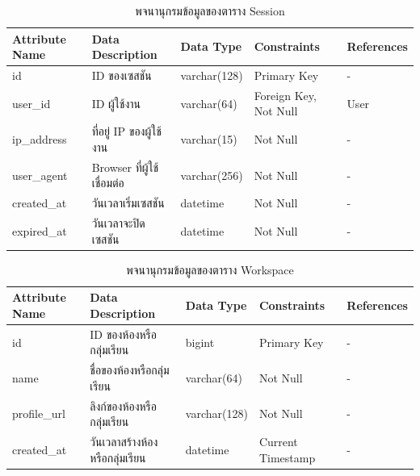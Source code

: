 \documentclass[12pt,one side,openright,a4paper]{cpe-thesis-th}
\begin{document}
    \begin{table}[H]
        \centering
        \caption{พจนานุกรมข้อมูลของตาราง Session}\label{tbl:data-dict-session}
        \begin{tabular}{p{2cm}|p{4cm}p{2cm}p{3cm}p{2cm}} \hline\hline
            Attribute Name & Data Description & Data Type & Constraints & References \\ \hline\hline
            id & ID ของเซสชัน & varchar(128) & Primary Key & - \\
            user\_id & ID ผู้ใช้งาน & varchar(64) & Foreign Key, Not Null & User \\
            ip\_address & ที่อยู่ IP ของผู้ใช้งาน & varchar(15) & Not Null & - \\
            user\_agent & Browser ที่ผู้ใช้เชื่อมต่อ & varchar(256) & Not Null & - \\
            created\_at & วันเวลาเริ่มเซสชัน & datetime & Not Null & - \\
            expired\_at & วันเวลาจะปิดเซสชัน & datetime & Not Null & - \\ \hline\hline
        \end{tabular}   
    \end{table}
    \begin{table}[H]
        \centering
        \caption{พจนานุกรมข้อมูลของตาราง Workspace}\label{tbl:data-dict-workspace}
        \begin{tabular}{p{2cm}|p{4cm}p{2cm}p{3cm}p{2cm}} \hline\hline
            Attribute Name & Data Description & Data Type & Constraints & References \\ \hline\hline
            id & ID ของห้องหรือกลุ่มเรียน & bigint & Primary Key & - \\
            name & ชื่อของห้องหรือกลุ่มเรียน & varchar(64) & Not Null & - \\
            profile\_url & ลิงก์ของห้องหรือกลุ่มเรียน & varchar(128) & Not Null & - \\
            created\_at & วันเวลาสร้างห้องหรือกลุ่มเรียน & datetime & Current Timestamp & - \\ \hline\hline
        \end{tabular}   
    \end{table}
\end{document}

